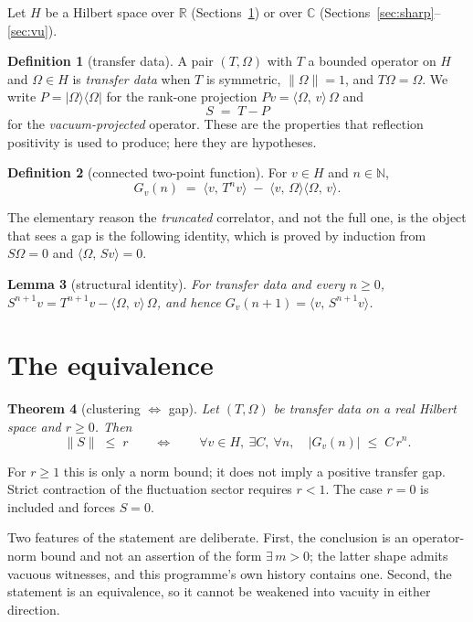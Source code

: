 \documentclass[11pt]{article}
\newtheorem{theorem}{Theorem}[section]
\newtheorem{lemma}[theorem]{Lemma}
\theoremstyle{definition}
\newtheorem{definition}[theorem]{Definition}
\newcommand{\R}{\mathbb{R}}
\newcommand{\C}{\mathbb{C}}
\newcommand{\Om}{\Omega}
\newcommand{\inn}[2]{\langle #1,\, #2\rangle}
\newcommand{\ket}[1]{|#1\rangle}
\newcommand{\bra}[1]{\langle #1|}
\begin{document}
Let $H$ be a Hilbert space over $\R$ (Sections~\ref{sec:equiv}) or over
$\C$ (Sections~\ref{sec:sharp}--\ref{sec:vu}).

\begin{definition}[transfer data]
\label{def:data}
A pair $(T,\Om)$ with $T$ a bounded operator on $H$ and $\Om \in H$ is
\emph{transfer data} when $T$ is symmetric, $\|\Om\| = 1$, and
$T\Om = \Om$.  We write $P = \ket{\Om}\bra{\Om}$ for the rank-one
projection $Pv = \inn{\Om}{v}\,\Om$ and
\[
  S \;=\; T - P
\]
for the \emph{vacuum-projected} operator.  These are the properties that
reflection positivity is used to produce; here they are hypotheses.
\end{definition}

\begin{definition}[connected two-point function]
\label{def:conn}
For $v \in H$ and $n \in \mathbb{N}$,
\[
  G_v(n) \;=\; \inn{v}{T^n v} \;-\; \inn{v}{\Om}\inn{\Om}{v}.
\]
\end{definition}

The elementary reason the \emph{truncated} correlator, and not the full
one, is the object that sees a gap is the following identity, which is
proved by induction from $S\Om = 0$ and $\inn{\Om}{Sv} = 0$.

\begin{lemma}[structural identity]
\label{lem:struct}
For transfer data and every $n \ge 0$,
$S^{n+1} v = T^{n+1} v - \inn{\Om}{v}\,\Om$, and hence
$G_v(n+1) = \inn{v}{S^{n+1} v}$.
\end{lemma}

\section{The equivalence}
\label{sec:equiv}

\begin{theorem}[clustering $\iff$ gap]
\label{thm:equiv}
Let $(T,\Om)$ be transfer data on a real Hilbert space and $r \ge 0$.
Then
\[
  \|S\| \;\le\; r
  \qquad\Longleftrightarrow\qquad
  \forall v \in H,\ \exists C,\ \forall n,\quad |G_v(n)| \;\le\; C\,r^n .
\]
\end{theorem}

For $r\ge1$ this is only a norm bound; it does not imply a positive
transfer gap.  Strict contraction of the fluctuation sector requires
$r<1$.  The case $r=0$ is included and forces $S=0$.

Two features of the statement are deliberate.  First, the conclusion is
an operator-norm bound and not an assertion of the form
$\exists\,m > 0$; the latter shape admits vacuous witnesses, and this
programme's own history contains one.  Second, the statement is an
equivalence, so it cannot be weakened into vacuity in either direction.
\end{document}
